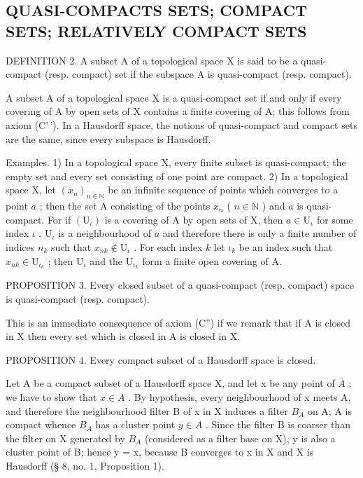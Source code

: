 \subsection{QUASI-COMPACTS SETS; COMPACT SETS; RELATIVELY COMPACT SETS}

DEFINITION 2. A subset A of a topological space X is said to be a quasi-compact (resp. compact) set if the subspace A is quasi-compact (resp. compact).

A subset A of a topological space X is a quasi-compact set if and only if every covering of A by open sets of X contains a finite covering of A; this follows from axiom (C'\,'). In a Hausdorff space, the notions of quasi-compact and compact sets are the same, since every subspace is Hausdorff.

Examples. 1) In a topological space X, every finite subset is quasi-compact; the empty set and every set consisting of one point are compact. 2) In a topological space X, let \((x_{n})_{n\in \mathbb{N}}\) be an infinite sequence of points which converges to a point \(a\) ; then the set A consisting of the points \(x_{n}\) ( \(n\in \mathbb{N}\) ) and \(a\) is quasi-compact. For if \((\mathrm{U}_{\iota})\) is a covering of A by open sets of X, then \(a\in \mathrm{U}_{\iota}\) for some index \(\iota\) . \(\mathrm{U}_{\iota}\) is a neighbourhood of \(a\) and therefore there is only a finite number of indices \(n_k\) such that \(x_{nk}\notin \mathrm{U}_{\iota}\) . For each index \(k\) let \(\iota_{k}\) be an index such that \(x_{nk}\in \mathrm{U}_{\iota_{k}}\) ; then \(\mathrm{U}_{\iota}\) and the \(\mathrm{U}_{\iota_{k}}\) form a finite open covering of A.

PROPOSITION 3. Every closed subset of a quasi-compact (resp. compact) space is quasi-compact (resp. compact).

This is an immediate consequence of axiom (C'') if we remark that if A is closed in X then every set which is closed in A is closed in X.

PROPOSITION 4. Every compact subset of a Hausdorff space is closed.

Let A be a compact subset of a Hausdorff space X, and let x be any point of \(\overline{A}\) ; we have to show that \(x \in A\) . By hypothesis, every neighbourhood of x meets A, and therefore the neighbourhood filter B of x in X induces a filter \(B_{A}\) on A; A is compact whence \(B_{A}\) has a cluster point \(y \in A\) . Since the filter B is coarser than the filter on X generated by \(B_{A}\) (considered as a filter base on X), y is also a cluster point of B; hence y = x, because B converges to x in X and X is Hausdorff (§ 8, no. 1, Proposition 1).

